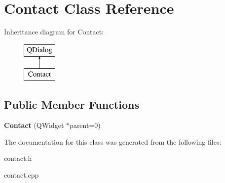 \hypertarget{class_contact}{}\section{Contact Class Reference}
\label{class_contact}
Inheritance diagram for Contact\+:\begin{figure}[H]
\begin{center}
\leavevmode
\includegraphics[height=2.000000cm]{class_contact}
\end{center}
\end{figure}
\subsection*{Public Member Functions}
\begin{DoxyCompactItemize}
\item 
\mbox{\label{class_contact_a55a5813b1b2a4ddf37634d74152a3fb6}} 
{\bfseries Contact} (Q\+Widget $\ast$parent=0)
\end{DoxyCompactItemize}


The documentation for this class was generated from the following files\+:\begin{DoxyCompactItemize}
\item 
contact.\+h\item 
contact.\+cpp\end{DoxyCompactItemize}

